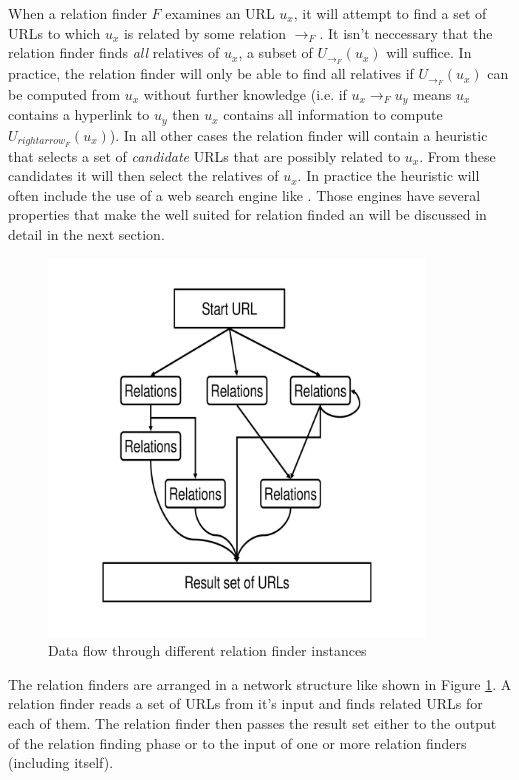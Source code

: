 \documentclass[a4paper]{danarticle}
\theoremstyle{remark}
\begin{document}
       When a relation finder $ F $ examines an URL $ u_x $, it will attempt to 
       find a set of URLs to which $ u_x $ is related by some relation 
       $ \rightarrow_F $. It isn't neccessary that the relation finder finds 
       \emph{all} relatives of $ u_x $, a subset of $ U_{\rightarrow_F}(u_x) $ 
       will suffice. In practice, the relation finder will only be able to find 
       all relatives if $ U_{\rightarrow_F}(u_x) $ can be computed from $ u_x $ 
       without further knowledge (i.e. if $ u_x \rightarrow_F u_y $ means 
       $ u_x $ contains a hyperlink to $ u_y $ then $ u_x $ contains all 
       information to compute $ U_{rightarrow_F}(u_x) $). In all other cases the 
       relation finder will contain a heuristic that selects a set of 
       \textit{candidate} URLs that are possibly related to $ u_x $. From these 
       candidates it will then select the relatives of $ u_x $. In practice the 
       heuristic will often include the use of a web search engine like 
       \cite{google}. Those engines have several properties that make the well 
       suited for relation finded an will be discussed in detail in the next 
       section.
       
       \begin{figure}[ht]
         \centering
	     \includegraphics[width=10cm]{relations}
	     \caption{Data flow through different relation finder instances}
	     \label{relations}
       \end{figure}
       The relation finders are arranged in a network structure like shown in 
       Figure \ref{relations}. A relation finder reads a set of URLs from it's 
       input and finds related URLs for each of them. The relation 
       finder then passes the result set either to the output of the relation 
       finding phase or to the input of one or more relation finders (including 
       itself).
       
\end{document}
